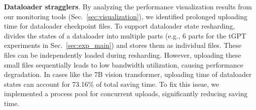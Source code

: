\noindent \textbf{Dataloader stragglers}. 
By analyzing the performance visualization results from our monitoring tools (Sec.~\ref{sec:visualization}),
we identified prolonged uploading time for dataloader checkpoint files.
To support dataloader state resharding, \sys{} divides the states of a dataloader into multiple parts (e.g., 6 parts for the tGPT experiments in Sec.~\ref{sec:exp_main}) and stores them as individual files.
These files can be independently loaded during resharding.
However, uploading these small files sequentially leads to low bandwidth utilization, causing performance degradation. %
In cases like the 7B vision transformer, uploading time of dataloader states can account for 73.16\% of total saving time.
To fix this issue, we implemented a process pool for concurrent uploads, significantly reducing saving time.

